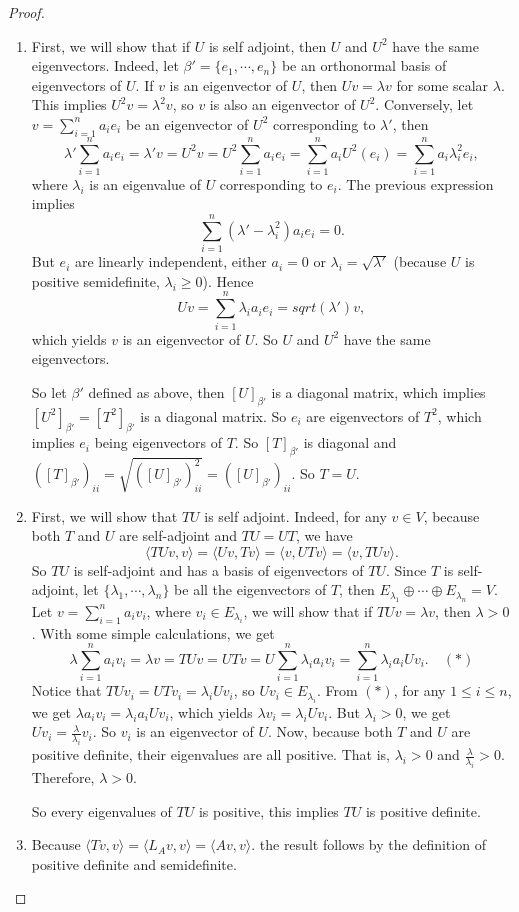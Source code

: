 \documentclass[12pt, a4paper]{article}
\theoremstyle{plain}
\begin{document}
\begin{proof}
\begin{enumerate}[label=(\alph*)]
	\item First, we will show that if $U$ is self adjoint, then $U$ and $U^2$ have the same eigenvectors. Indeed, let $\beta' = \{e_1,\cdots,e_n\}$ be an orthonormal basis of eigenvectors of $U$. If $v$ is an eigenvector of $U$, then $Uv = \lambda v$ for some scalar $\lambda$. This implies $U^2v = \lambda^2 v$, so $v$ is also an eigenvector of $U^2$. Conversely, let $v = \sum_{i=1}^{n}{a_ie_i}$ be an eigenvector of $U^2$ corresponding to $\lambda'$, then 
	\[
	\lambda' \sum_{i=1}^{n}{a_ie_i} = \lambda' v = U^2 v = U^2 \sum_{i=1}^{n}{a_ie_i} = \sum_{i=1}^{n}{a_iU^2(e_i)} = \sum_{i=1}^{n}{a_i\lambda_i^2 e_i},
	\]
	where $\lambda_i$ is an eigenvalue of $U$ corresponding to $e_i$. The previous expression implies
	\[
	\sum_{i=1}^{n}{(\lambda'-\lambda_i^2)a_ie_i} =0.
	\]
	But $e_i$ are linearly independent, either $a_i=0$ or $\lambda_i = \sqrt{\lambda'}$ (because $U$ is positive semidefinite, $\lambda_i\geq 0$). Hence 
	\[
	Uv = \sum_{i=1}^{n}{\lambda_ia_ie_i} = sqrt(\lambda')v,
	\]
	which yields $v$ is an eigenvector of $U$. So $U$ and $U^2$ have the same eigenvectors.
	
	So let $\beta'$ defined as above, then $[U]_{\beta'}$ is a diagonal matrix, which implies $[U^2]_{\beta'} = [T^2]_{\beta'}$ is a diagonal matrix. So $e_i$ are eigenvectors of $T^2$, which implies $e_i$ being eigenvectors of $T$. So $[T]_{\beta'}$ is diagonal and $([T]_{\beta'})_{ii} = \sqrt{([U]_{\beta'})_{ii}^2} = ([U]_{\beta'})_{ii}$. So $T=U$.
	\item First, we will show that $TU$ is self adjoint. Indeed, for any $v\in V$, because both $T$ and $U$ are self-adjoint and $TU=UT$, we have
	\[
	\langle{TUv,v}\rangle = \langle{Uv,Tv}\rangle = \langle{v,UTv}\rangle = \langle{v,TUv}\rangle.
	\]
	So $TU$ is self-adjoint and has a basis of eigenvectors of $TU$. Since $T$ is self-adjoint, let $\{\lambda_1,\cdots,\lambda_n\}$ be all the eigenvectors of $T$, then $E_{\lambda_1}\oplus\cdots\oplus E_{\lambda_n} = V$. Let $v = \sum_{i=1}^{n}{a_iv_i}$, where $v_i\in E_{\lambda_i}$, we will show that if $TUv = \lambda v$, then $\lambda > 0$. With some simple calculations, we get
	\[
	\lambda \sum_{i=1}^{n}{a_iv_i} = \lambda v= TU v= UTv= U\sum_{i=1}^{n}{\lambda_ia_iv_i}= \sum_{i=1}^{n}{\lambda_ia_iUv_i}.\quad (*)
	\]
	Notice that $TUv_i = UTv_i = \lambda_i Uv_i$, so $Uv_i\in E_{\lambda_i}$. From $(*)$, for any $1\leq i\leq n$, we get $\lambda a_i v_i = \lambda_i a_i Uv_i$, which yields $\lambda v_i = \lambda_i Uv_i$. But $\lambda_i>0$, we get $Uv_i = \frac{\lambda}{\lambda_i} v_i$. So $v_i$ is an eigenvector of $U$. Now, because both $T$ and $U$ are positive definite, their eigenvalues are all positive. That is, $\lambda_i> 0$ and $\frac{\lambda}{\lambda_i}> 0$. Therefore, $\lambda > 0$. 
	
	So every eigenvalues of $TU$ is positive, this implies $TU$ is positive definite.
	\item Because $\langle{Tv,v}\rangle = \langle{L_Av,v}\rangle = \langle{Av,v}\rangle$. the result follows by the definition of positive definite and semidefinite.
	\end{enumerate}
	\end{proof}
	
\end{document}
